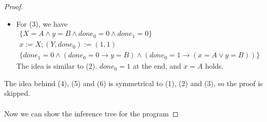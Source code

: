 \begin{proof}
\begin{itemize}
\item For (3), we have
\begin{gather*}
\{X=A\land y=B\land done_0=0\land done_1=0\}\\
x:=X;(Y,done_0):=(1,1)\\
\{done_1=0\land (done_0=0\rightarrow y=B)\land (done_0=1\rightarrow (x=A\lor y=B))\}
\end{gather*}
The idea is similar to (2). $done_0=1$ at the end, and $x=A$ holds.
\end{itemize}
The idea behind (4), (5) and (6) is symmetrical to (1), (2) and (3), so the proof is skipped.\\ \\
Now we can show the inference tree for the program
\end{proof}